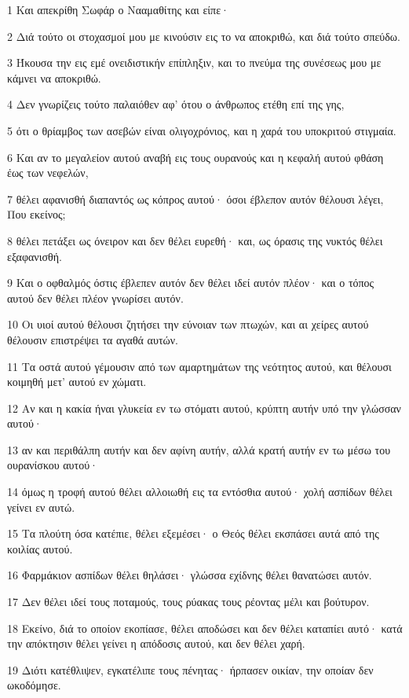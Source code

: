 \par 1 Και απεκρίθη Σωφάρ ο Νααμαθίτης και είπε·
\par 2 Διά τούτο οι στοχασμοί μου με κινούσιν εις το να αποκριθώ, και διά τούτο σπεύδω.
\par 3 Ήκουσα την εις εμέ ονειδιστικήν επίπληξιν, και το πνεύμα της συνέσεως μου με κάμνει να αποκριθώ.
\par 4 Δεν γνωρίζεις τούτο παλαιόθεν αφ' ότου ο άνθρωπος ετέθη επί της γης,
\par 5 ότι ο θρίαμβος των ασεβών είναι ολιγοχρόνιος, και η χαρά του υποκριτού στιγμαία.
\par 6 Και αν το μεγαλείον αυτού αναβή εις τους ουρανούς και η κεφαλή αυτού φθάση έως των νεφελών,
\par 7 θέλει αφανισθή διαπαντός ως κόπρος αυτού· όσοι έβλεπον αυτόν θέλουσι λέγει, Που εκείνος;
\par 8 θέλει πετάξει ως όνειρον και δεν θέλει ευρεθή· και, ως όρασις της νυκτός θέλει εξαφανισθή.
\par 9 Και ο οφθαλμός όστις έβλεπεν αυτόν δεν θέλει ιδεί αυτόν πλέον· και ο τόπος αυτού δεν θέλει πλέον γνωρίσει αυτόν.
\par 10 Οι υιοί αυτού θέλουσι ζητήσει την εύνοιαν των πτωχών, και αι χείρες αυτού θέλουσιν επιστρέψει τα αγαθά αυτών.
\par 11 Τα οστά αυτού γέμουσιν από των αμαρτημάτων της νεότητος αυτού, και θέλουσι κοιμηθή μετ' αυτού εν χώματι.
\par 12 Αν και η κακία ήναι γλυκεία εν τω στόματι αυτού, κρύπτη αυτήν υπό την γλώσσαν αυτού·
\par 13 αν και περιθάλπη αυτήν και δεν αφίνη αυτήν, αλλά κρατή αυτήν εν τω μέσω του ουρανίσκου αυτού·
\par 14 όμως η τροφή αυτού θέλει αλλοιωθή εις τα εντόσθια αυτού· χολή ασπίδων θέλει γείνει εν αυτώ.
\par 15 Τα πλούτη όσα κατέπιε, θέλει εξεμέσει· ο Θεός θέλει εκσπάσει αυτά από της κοιλίας αυτού.
\par 16 Φαρμάκιον ασπίδων θέλει θηλάσει· γλώσσα εχίδνης θέλει θανατώσει αυτόν.
\par 17 Δεν θέλει ιδεί τους ποταμούς, τους ρύακας τους ρέοντας μέλι και βούτυρον.
\par 18 Εκείνο, διά το οποίον εκοπίασε, θέλει αποδώσει και δεν θέλει καταπίει αυτό· κατά την απόκτησιν θέλει γείνει η απόδοσις αυτού, και δεν θέλει χαρή.
\par 19 Διότι κατέθλιψεν, εγκατέλιπε τους πένητας· ήρπασεν οικίαν, την οποίαν δεν ωκοδόμησε.
